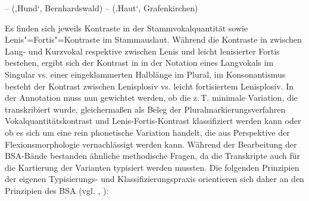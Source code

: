 \ea\label{ex:6:1}   –  (‚Hund‘, Bernhardswald)
\ex\label{ex:6:2}  –  (‚Haut‘, Grafenkirchen)
\z

Es finden sich jeweils Kontraste in der Stammvokalquantität sowie Lenis"=Fortis"=Kontraste im Stammauslaut. Während die Kontraste in  zwischen Lang- und Kurzvokal respektive zwischen Lenis und leicht lenisierter Fortis bestehen, ergibt sich der Kontrast in  in der Notation eines Langvokals im Singular vs. einer eingeklammerten Halblänge im Plural, im Konsonantismus besteht der Kontrast zwischen Lenisplosiv vs. leicht fortisiertem Lenisplosiv. In der Annotation muss nun gewichtet werden, ob die z.\,T. minimale Variation, die transkribiert wurde, gleichermaßen als Beleg der Pluralmarkierungsverfahren Vokalquantitätskontrast und Lenis-Fortis-Kontrast klassifiziert werden kann oder ob es sich um eine rein phonetische Variation handelt, die aus Perspektive der Flexionsmorphologie vernachlässigt werden kann. Während der Bearbeitung der BSA-Bände bestanden ähnliche methodische Fragen, da die Transkripte auch für die Kartierung der Varianten typisiert werden mussten. Die folgenden Prinzipien der eigenen Typisierungs- und Klassifizierungspraxis orientieren sich daher an den Prinzipien des BSA (vgl. \citealt[6]{SMF2.1}, \citealt[18]{SUF1}):\largerpage


